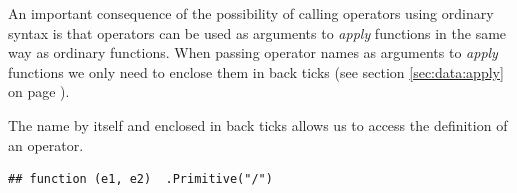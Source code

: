 \documentclass[krantz2]{krantz}\usepackage{knitr}
\begin{document}
An important consequence of the possibility of calling operators using ordinary syntax is that operators can be used as arguments to \emph{apply} functions in the same way as ordinary functions. When passing operator names as arguments to \emph{apply} functions we only need to enclose them in back ticks (see section \ref{sec:data:apply} on page \pageref{sec:data:apply}).

The name by itself and enclosed in back ticks allows us to access the definition of an operator.

\begin{knitrout}\footnotesize
{}\color{fgcolor}\begin{kframe}
\begin{alltt}
\end{alltt}
\begin{verbatim}
## function (e1, e2)  .Primitive("/")
\end{verbatim}
\end{kframe}
\end{knitrout}
\end{document}

